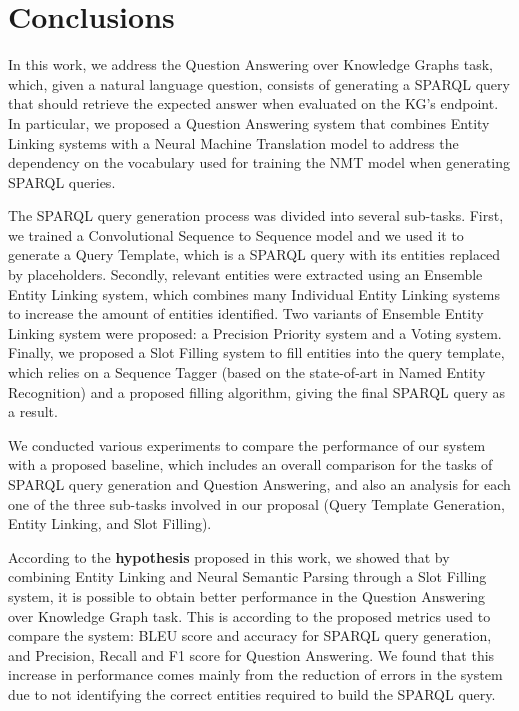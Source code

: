 \chapter{Conclusions}
\label{cap6:conclusions}
In this work, we address the Question Answering over Knowledge Graphs task, which, given a natural 
language question, consists of generating a SPARQL query that should retrieve the expected answer 
when evaluated on the KG’s endpoint. In particular, we proposed a Question Answering system that 
combines Entity Linking systems with a Neural Machine Translation model to address the dependency on 
the vocabulary used for training the NMT model when generating SPARQL queries.

The SPARQL query generation process was divided into several sub-tasks. First, we trained a 
Convolutional Sequence to Sequence model and we used it to generate a Query Template, which is a 
SPARQL query with its entities replaced by placeholders. Secondly, relevant entities were extracted 
using an Ensemble Entity Linking system, which combines many Individual Entity Linking systems to 
increase the amount of entities identified. Two variants of Ensemble Entity Linking system were 
proposed: a Precision Priority system and a Voting system. Finally, we proposed a Slot Filling system 
to fill entities into the query template, which relies on a Sequence Tagger (based on the 
state-of-art in Named Entity Recognition) and a proposed filling algorithm, giving the final SPARQL 
query as a result.

We conducted various experiments to compare the performance of our system with a proposed baseline, 
which includes an overall comparison for the tasks of SPARQL query generation and Question Answering, 
and also an analysis for each one of the three sub-tasks involved in our proposal (Query Template 
Generation, Entity Linking, and Slot Filling).

According to the \textbf{hypothesis} proposed in this work, we showed that by combining Entity 
Linking and Neural Semantic Parsing through a Slot Filling system, it is possible to obtain better 
performance in the Question Answering over Knowledge Graph task. This is according to the proposed 
metrics used to compare the system: BLEU score and accuracy for SPARQL query generation, and Precision, 
Recall and F1 score for Question Answering. We found that this increase in performance comes mainly 
from the reduction of errors in the system due to not identifying the correct entities required to 
build the SPARQL query.

